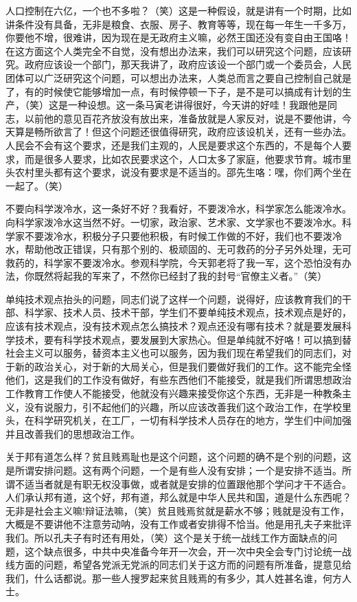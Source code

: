 人口控制在六亿，一个也不多啦？（笑）这是一种假设，就是讲有一个时期，比如讲条件没有具备，无非是粮食、衣服、房子、教育等等，现在每一年生一千多万，你要他不增，很难讲，因为现在是无政府主义嘛，必然王国还没有变自由王国咯！在这方面这个人类完全不自觉，没有想出办法来，我们可以研究这个问题，应该研究。政府应该设一个部门，那天我讲了，政府应该设一个部门或一个委员会，人民团体可以广泛研究这个问题，可以想出办法来，人类总而言之要自己控制自己就是了，有的时候使它能够增加一点，有时候停顿一下子，是不是可以搞成有计划的生产，（笑）这是一种设想。这一条马寅老讲得很好，今天讲的好哇！我跟他是同志，以前他的意见百花齐放没有放出来，准备放就是人家反对，说是不要他讲，今天算是畅所欲言了！但这个问题还很值得研究，政府应该设机关，还有一些办法。人民会不会有这个要求，还是我们主观的，人民是要求这个东西的，不是每个人要求，而是很多人要求，比如农民要求这个，人口太多了家庭，他要求节育。城市里头农村里头都有这个要求，说没有要求是不适当的。邵先生咯：嘿，你们两个坐在一起了。（笑）

不要向科学泼冷水，这一条好不好？我看好，不要泼冷水，科学家怎么能泼冷水。向科学家泼冷水这当然不好。一切家，政治家、艺术家、文学家也不要泼冷水。科学家不要泼冷水，积极分子只要他积极，有时候工作做的不好，我们也不要泼冷水，帮助他改正错误，只有那个别的、极顽固的、无可救药的分子另外处理，无可救药的，科学家不要泼冷水。参观科学院，今天郭老将了我一军，这个恐怕没有办法，你既然将起我的军来了，不然你已经封了我的封号“官僚主义者。”（笑）

单纯技术观点抬头的问题，同志们说了这样一个问题，说得好，应该教育我们的干部、科学家、技术人员、技术干部，学生们不要单纯技术观点，技术观点是好的，应该有技术观点，没有技术观点怎么搞技术？观点还没有哪有技术？就是要发展科学技术，要有科学技术观点，要发展到大家热心。但是单纯就不好咯！可以搞到替社会主义可以服务，替资本主义也可以服务，因为我们现在希望我们的同志们，对于新的政治关心，对于新的大局关心，但是我们要做好我们的工作。这不能完全怪他们，这是我们的工作没有做好，有些东西他们不能接受，就是我们所谓思想政治工作教育工作使人不能接受，他就没有兴趣来接受你这个东西，无非是一种教条主义，没有说服力，引不起他们的兴趣，所以应该改善我们这个政治工作，在学校里头，在科学研究机关，在工厂，一切有科学技术人员存在的地方，学生们中间加强并且改善我们的思想政治工作。

关于邦有道怎么样？贫且贱焉耻也是这个问题，这个问题的确不是个别的问题，这是所谓安排问题。这有两个问题，一个是有些人没有安排；一个是安排不适当。所谓不适当者就是有职无权没事做，或者就是安排的位置跟他那个学问才干不适合。人们承认邦有道，这个好，邦有道，邦么就是中华人民共和国，道是什么东西呢？无非是社会主义嘛!辩证法嘛，（笑）贫且贱焉贫就是薪水不够；贱就是没有工作，大概是不要讲他不注意劳动呐，没有工作或者安排得不恰当。他是用孔夫子来批评我们。所以孔夫子有时还有用处，（笑）这个是关于统一战线工作方面缺点的问题，这个缺点很多，中共中央准备今年开一次会，开一次中央全会专门讨论统一战线方面的问题，希望各党派无党派的同志们关于这方而的问题有所准备，提意见给我们，什么话都说。那一些人搜罗起来贫且贱焉的有多少，其人姓甚名谁，何方人士。

